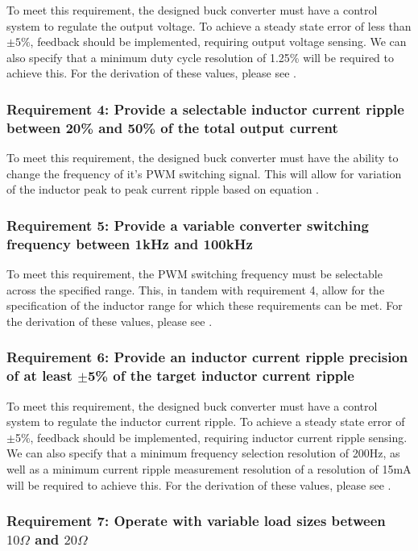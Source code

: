 To meet this requirement, the designed buck converter must have a control system to regulate the output voltage. To achieve a steady state error of less than $\pm5\%$, feedback should be implemented, requiring output voltage sensing. We can also specify that a minimum duty cycle resolution of 1.25\% will be required to achieve this. For the derivation of these values, please see .

\subsubsection*{Requirement 4: Provide a selectable inductor current ripple between 20\% and 50\% of the total output current}

To meet this requirement, the designed buck converter must have the ability to change the frequency of it's PWM switching signal. This will allow for variation of the inductor peak to peak current ripple based on equation . 

\subsubsection*{Requirement 5: Provide a variable converter switching frequency between 1kHz and 100kHz}

To meet this requirement, the PWM switching frequency must be selectable across the specified range. This, in tandem with requirement 4, allow for the specification of the inductor range for which these requirements can be met. For the derivation of these values, please see .

\subsubsection*{Requirement 6: Provide  an  inductor  current  ripple  precision  of  at  least $\pm$5\%  of  the  target  inductor current ripple}

To meet this requirement, the designed buck converter must have a control system to regulate the inductor current ripple. To achieve a steady state error of $\pm$5\%, feedback should be implemented, requiring inductor current ripple sensing. We can also specify that a minimum frequency selection resolution of 200Hz, as well as a minimum current ripple measurement resolution of a resolution of 15mA will be required to achieve this. For the derivation of these values, please see .  


\subsubsection*{Requirement 7: Operate with variable load sizes between $10\Omega$ and $20\Omega$}


